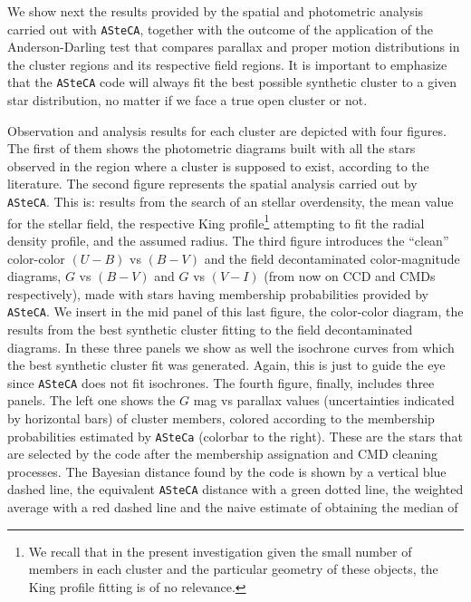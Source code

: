 \documentclass[draft]{aa}
\begin{document}
We show next the results provided by the spatial and photometric analysis
carried out with \texttt{ASteCA}, together with the outcome of the application
of the Anderson-Darling test that compares parallax and proper motion
distributions in the cluster regions and its respective field regions.
It is important to emphasize that the \texttt{ASteCA} code will always fit the
best possible synthetic cluster to a given star distribution, no matter if we
face a true open cluster or not.

Observation and analysis results for each cluster are depicted with four
figures. The first of them shows the photometric diagrams built with
all the stars observed in the region where a cluster is supposed to exist,
according to the literature.
The second figure represents the spatial analysis carried out by
\texttt{ASteCA}. This is: results from the search of an stellar overdensity, the
mean value for the stellar field, the respective King profile\footnote{We
recall that in the present investigation given the small number of members in
each cluster and the particular geometry of these objects, the King profile
fitting is of no relevance.} attempting to fit the radial density profile, and
the assumed radius.
The third figure introduces the ``clean'' color-color $(U-B)$ vs $(B-V)$ and
the field decontaminated color-magnitude diagrams, $G$ vs $(B-V)$ and $G$ vs $
(V-I)$ (from now on CCD and CMDs respectively), made with stars having
membership probabilities provided by \texttt{ASteCA}. We insert in the
mid panel of this last figure, the color-color diagram, the results from the
best synthetic cluster fitting to the field decontaminated diagrams. In these
three panels we show as well the isochrone curves from which the best
synthetic cluster fit was generated. Again, this is just to guide the eye since
\texttt{ASteCA} does not fit isochrones.
%
The fourth figure, finally, includes three panels. The left one shows the
$G$ mag vs parallax values (uncertainties indicated by horizontal bars) of
cluster members, colored according to the membership probabilities
estimated by \texttt{ASteCa} (colorbar to the right). These are the stars that
are selected by the code after the membership assignation and CMD cleaning
processes.
%
The Bayesian distance found by the code is shown by a vertical blue dashed line,
the equivalent \texttt{ASteCA} distance with a green dotted line, the weighted
average with a red dashed line and the naive estimate of obtaining the median of
\end{document}
